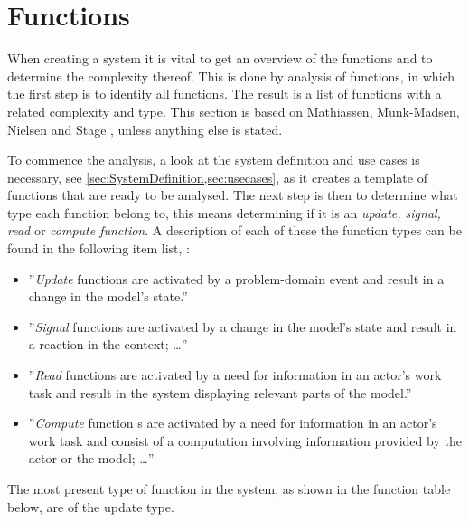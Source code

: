 \section{Functions}
When creating a system it is vital to get an overview of the functions and to determine the complexity thereof.
This is done by analysis of functions, in which the first step is to identify all functions.
The result is a list of functions with a related complexity and type.
This section is based on Mathiassen, Munk-Madsen, Nielsen and Stage \citep[ch.~7]{Rod-Aalborg}, unless anything else is stated.

To commence the analysis, a look at the system definition and use cases is necessary, see \cref{sec:SystemDefinition,sec:usecases}, as it creates a template of functions that are ready to be analysed.
The next step is then to determine what type each function belong to, this means determining if it is an \textit{update, signal, read} or \textit{compute function}.
A description of each of these the function types can be found in the following item list, \citep[p.~140]{Rod-Aalborg}:
\begin{itemize}
	\item 
	''\textit{Update} functions are  activated by a problem-domain event and result in a change in the model's state.''
	\item 
	''\textit{Signal} functions are activated by a change in the model's state and result in a reaction in the context; \ldots''
	\item
	''\textit{Read} functions are activated by a need for information in an actor's work task and result in the system displaying relevant parts of the model.''
	\item
	''\textit{Compute} function s are activated by a need for information in an actor's work task and consist of a computation involving information provided by the actor or the model; \ldots''
\end{itemize}

The most present type of function in the system, as shown in the function table below, are of the update type.


